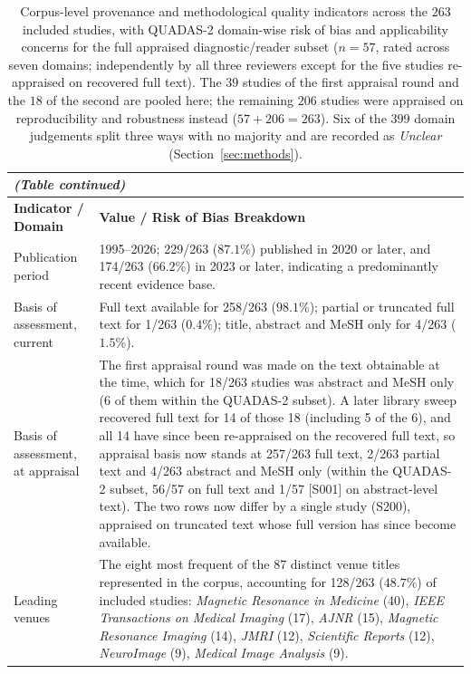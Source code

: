 \documentclass[review,authoryear]{elsarticle}
\begin{document}
{\def\baselinestretch{1}\footnotesize
\setlength{\tabcolsep}{5pt}
\renewcommand{\arraystretch}{1.15}
\begin{longtable}{p{} p{}}
\caption{Corpus-level provenance and methodological quality indicators across the
$263$ included studies, with QUADAS-2 domain-wise risk of bias and applicability
concerns for the full appraised diagnostic/reader subset ($n=57$, rated across seven
domains; independently by all three reviewers except for the five studies re-appraised
on recovered full text). The $39$ studies of the
first appraisal round and the $18$ of the second are pooled here; the remaining
$206$ studies were appraised on reproducibility and robustness instead
($57+206=263$). Six of the $399$ domain judgements split three ways with no majority and
are recorded as \emph{Unclear} (Section~\ref{sec:methods}).}\label{tab:quality_appraisal}\\
\endfirsthead
\multicolumn{2}{l}{\footnotesize\emph{(Table \thetable{} continued)}}\\
\endhead
\hline
\textbf{Indicator / Domain} & \textbf{Value / Risk of Bias Breakdown} \\
\hline
Publication period & 1995--2026; 229/263 ($87.1\%$) published in 2020 or later, and 174/263 ($66.2\%$) in 2023 or later, indicating a predominantly recent evidence base. \\
Basis of assessment, current & Full text available for 258/263 ($98.1\%$); partial or truncated full text for 1/263 ($0.4\%$); title, abstract and MeSH only for 4/263 ($1.5\%$). \\
Basis of assessment, at appraisal & The first appraisal round was made on the text obtainable at the time, which for 18/263 studies was abstract and MeSH only (6 of them within the QUADAS-2 subset). A later library sweep recovered full text for 14 of those 18 (including 5 of the 6), and all 14 have since been re-appraised on the recovered full text, so appraisal basis now stands at 257/263 full text, 2/263 partial text and 4/263 abstract and MeSH only (within the QUADAS-2 subset, 56/57 on full text and 1/57 [S001] on abstract-level text). The two rows now differ by a single study (S200), appraised on truncated text whose full version has since become available. \\
Leading venues & The eight most frequent of the 87 distinct venue titles represented in the corpus, accounting for 128/263 ($48.7\%$) of included studies: \emph{Magnetic Resonance in Medicine} (40), \emph{IEEE Transactions on Medical Imaging} (17), \emph{AJNR} (15), \emph{Magnetic Resonance Imaging} (14), \emph{JMRI} (12), \emph{Scientific Reports} (12), \emph{NeuroImage} (9), \emph{Medical Image Analysis} (9). \\

\end{longtable}}
\end{document}
